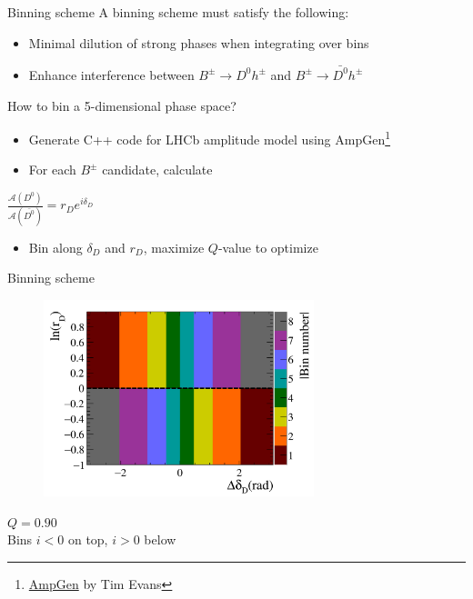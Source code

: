 \documentclass{beamer}
\begin{document}
\begin{frame}{Binning scheme}
  \vspace{0.0cm}
  {\Large A binning scheme must satisfy the following:}
  \begin{itemize}
    \item{Minimal dilution of strong phases when integrating over bins}
    \item{Enhance interference between $B^\pm\to D^0h^\pm$ and $B^\pm\to\bar{D^0}h^\pm$}
  \end{itemize}
  \vspace{0.4cm}
  {\Large How to bin a 5-dimensional phase space?}
  \begin{itemize}
    \item{Generate C++ code for LHCb amplitude model using AmpGen\footnote{\href{https://github.com/GooFit/AmpGen}{AmpGen} by Tim Evans}}
    \item{For each $B^\pm$ candidate, calculate}
  \end{itemize}
  \begin{center}
    {\Large $\frac{\mathcal{A}(D^0)}{\mathcal{A}(\bar{D^0})} = r_De^{i\delta_D}$}
  \end{center}
  \begin{itemize}
    \item{Bin along $\delta_D$ and $r_D$, maximize $Q$-value to optimize}
  \end{itemize}
\end{frame}

\begin{frame}{Binning scheme}
  \begin{figure}
    \centering
    \includegraphics[width = 0.7\textwidth]{Plots/BinningSchemePlot_8Bins.png}
  \end{figure}
  \vspace{-1.0cm}
  \begin{center}
    $Q = 0.90$ \\
    Bins $i < 0$ on top, $i > 0$ below
  \end{center}
\end{frame}
\end{document}
